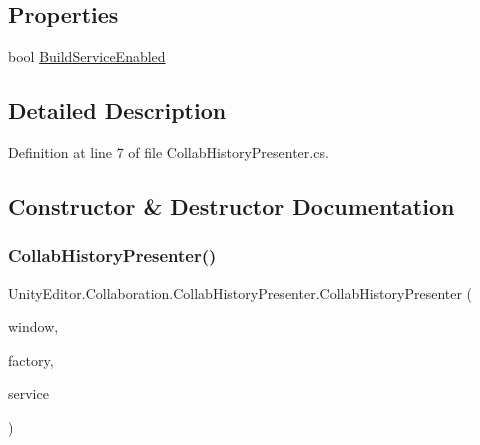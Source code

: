 \subsection*{Properties}
\begin{DoxyCompactItemize}
\item 
bool \mbox{\hyperlink{class_unity_editor_1_1_collaboration_1_1_collab_history_presenter_a8a575bcd378e10cd9f3a3c84266933fd}{Build\+Service\+Enabled}}
\end{DoxyCompactItemize}


\subsection{Detailed Description}


Definition at line 7 of file Collab\+History\+Presenter.\+cs.



\subsection{Constructor \& Destructor Documentation}
\mbox{\label{class_unity_editor_1_1_collaboration_1_1_collab_history_presenter_a98a53853b14ff55206d6d1a0c97529f1}} 
\subsubsection{\texorpdfstring{CollabHistoryPresenter()}{CollabHistoryPresenter()}}
{\footnotesize\ttfamily Unity\+Editor.\+Collaboration.\+Collab\+History\+Presenter.\+Collab\+History\+Presenter (\begin{DoxyParamCaption}\item[{I\+Collab\+History\+Window}]{window,  }\item[{\mbox{\hyperlink{interface_unity_editor_1_1_collaboration_1_1_i_collab_history_item_factory}{I\+Collab\+History\+Item\+Factory}}}]{factory,  }\item[{I\+Revisions\+Service}]{service }\end{DoxyParamCaption})}



